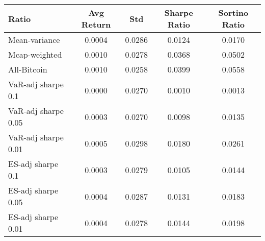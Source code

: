 \begin{tabular}{lcccc}
\toprule
Ratio & Avg Return & Std & Sharpe Ratio & Sortino Ratio\\
\midrule
Mean-variance & 0.0004 & 0.0286 & 0.0124 & 0.0170\\
Mcap-weighted & 0.0010 & 0.0278 & 0.0368 & 0.0502\\
All-Bitcoin & 0.0010 & 0.0258 & 0.0399 & 0.0558\\
VaR-adj sharpe 0.1 & 0.0000 & 0.0270 & 0.0010 & 0.0013\\
VaR-adj sharpe 0.05 & 0.0003 & 0.0270 & 0.0098 & 0.0135\\
VaR-adj sharpe 0.01 & 0.0005 & 0.0298 & 0.0180 & 0.0261\\
ES-adj sharpe 0.1 & 0.0003 & 0.0279 & 0.0105 & 0.0144\\
ES-adj sharpe 0.05 & 0.0004 & 0.0287 & 0.0131 & 0.0183\\
ES-adj sharpe 0.01 & 0.0004 & 0.0278 & 0.0144 & 0.0198\\
\bottomrule
\end{tabular}
